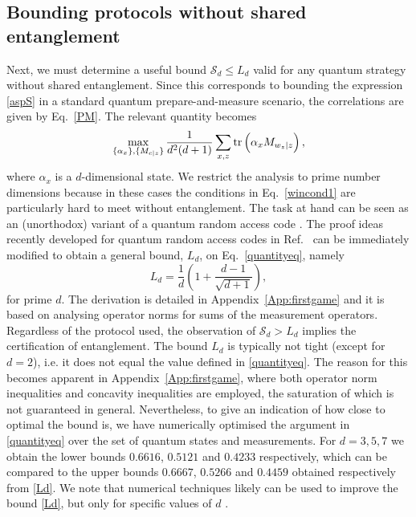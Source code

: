\documentclass[aps,superscriptaddress,twocolumn,twoside,floatfix,pra,nofootinbib,a4paper]{revtex4-2}
\begin{document}
\subsection{Bounding protocols without shared entanglement}
Next, we must determine a useful bound $\mathcal{S}_d\leq L_d$ valid for any quantum strategy without shared entanglement. Since this corresponds to bounding the expression \eqref{aspS} in a standard quantum prepare-and-measure scenario,  the correlations are given by Eq.~\eqref{PM}. The relevant quantity becomes
\begin{equation}\label{quantityeq}
\max_{\{\alpha_x\}, \{M_{c|z}\}} \frac{1}{d^2(d+1)}\sum_{x,z} \tr\left(\alpha_x M_{w_z|z}\right),
\end{equation}
where $\alpha_x$ is a $d$-dimensional state. We restrict the analysis to prime number dimensions because in these cases the conditions in Eq.~\eqref{wincond1} are particularly hard to meet without entanglement. The task at hand can be seen as an (unorthodox) variant of a quantum random access code \cite{Ambainis1999, Tavakoli2015}. The proof ideas recently developed for quantum random access codes in Ref.~\cite{farkas2023simple} can be immediately modified to obtain a general bound, $L_d$, on Eq.~\eqref{quantityeq}, namely
\begin{equation}\label{Ld}
L_d=\frac{1}{d}\left(1+\frac{d-1}{\sqrt{d+1}}\right),
\end{equation}
for prime $d$. The derivation is detailed in  Appendix~\ref{App:firstgame} and it is based on analysing operator norms for sums of the measurement operators. Regardless of the protocol used, the observation of $\mathcal{S}_d>L_d$ implies the certification of entanglement. The bound $L_d$ is typically not tight (except for $d=2$), i.e. it does not equal the value defined in \eqref{quantityeq}. The reason for this becomes apparent in Appendix~\ref{App:firstgame}, where both operator norm inequalities and concavity inequalities are employed, the saturation of which is not guaranteed in general. Nevertheless, to give an indication of how close to optimal the bound is, we have numerically optimised the argument in \eqref{quantityeq} over the set of quantum states and measurements. For $d=3,5,7$ we obtain the lower bounds $0.6616$, $0.5121$ and $0.4233$ respectively, which can be compared to the upper bounds $0.6667$, $0.5266$ and $0.4459$ obtained respectively from \eqref{Ld}.  We note that numerical techniques likely can be used to improve the bound \eqref{Ld}, but only for specific values of $d$ \cite{Rosset2019}.
\end{document}
